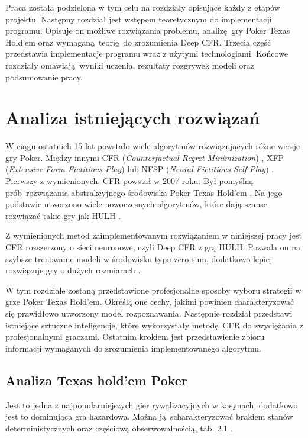 \documentclass[12pt,oneside,a4paper]{report}
\begin{document}
Praca została podzielona w tym celu na rozdziały opisujące każdy z etapów projektu.
Następny rozdział jest wstępem teoretycznym do implementacji programu. Opisuje on 
możliwe rozwiązania problemu, analizę gry Poker Texas Hold'em oraz wymaganą teorię do zrozumienia
Deep CFR.
Trzecia część przedstawia implementacje programu wraz z użytymi technologiami. Końcowe rozdziały 
omawiają wyniki uczenia, rezultaty
rozgrywek modeli oraz podsumowanie pracy.

\chapter{Analiza istniejących rozwiązań}

W ciągu ostatnich 15 lat powstało wiele algorytmów rozwiązujących różne wersje gry Poker.
Między innymi CFR (\emph{Counterfactual Regret Minimization}) \cite{CFR}, XFP (\emph{Extensive-Form
Fictitious Play}) \cite{XFP} lub
NFSP (\emph{Neural Fictitious Self-Play}) \cite{NFSP}.
Pierwszy z wymienionych, CFR powstał w 2007 roku. Był 
pomyślną prób rozwiązania abstrakcyjnego środowiska Poker Texas Hold'em \cite{CFR}. 
Na jego podstawie utworzono wiele nowoczesnych
algorytmów, które dają szanse rozwiązać takie gry jak HULH \cite{CFR}.


Z wymienionych metod zaimplementowanym rozwiązaniem w niniejszej pracy jest CFR 
rozszerzony o sieci neuronowe,
czyli Deep CFR z grą HULH. Pozwala on na szybsze trenowanie modeli w środowisku typu zero-sum,
dodatkowo lepiej rozwiązuje gry o dużych rozmiarach \cite{DCFR}.

W tym rozdziale zostaną przedstawione profesjonalne sposoby wyboru strategii w grze Poker Texas Hold'em. 
Określą one cechy, jakimi powinien charakteryzować się prawidłowo utworzony model rozpoznawania.
Następnie rozdział przedstawi istniejące sztuczne inteligencje, które wykorzystały metodę CFR do
zwyciężania z profesjonalnymi graczami.
Ostatnim krokiem jest przedstawienie zbioru informacji wymaganych 
do zrozumienia implementowanego algorytmu.

\section{Analiza Texas hold'em Poker}

Jest to jedna z najpopularniejszych gier rywalizacyjnych w kasynach, dodatkowo jest to
dominująca gra hazardowa. Można ją scharakteryzować brakiem stanów deterministycznych oraz częściową 
obserwowalnością, tab. 2.1 \cite{poker}.  
\end{document}
